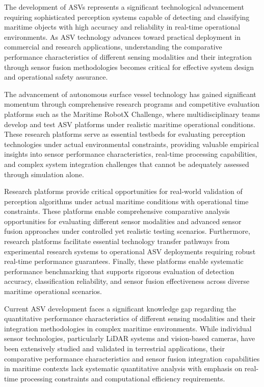 \documentclass{erauthesis}
\begin{document}
The development of \acp{ASV} represents a significant technological advancement requiring sophisticated perception systems capable of detecting and classifying maritime objects with high accuracy and reliability in real-time operational environments. As \ac{ASV} technology advances toward practical deployment in commercial and research applications, understanding the comparative performance characteristics of different sensing modalities and their integration through sensor fusion methodologies becomes critical for effective system design and operational safety assurance.

The advancement of autonomous surface vessel technology has gained significant momentum through comprehensive research programs and competitive evaluation platforms such as the Maritime RobotX Challenge, where multidisciplinary teams develop and test \ac{ASV} platforms under realistic maritime operational conditions. These research platforms serve as essential testbeds for evaluating perception technologies under actual environmental constraints, providing valuable empirical insights into sensor performance characteristics, real-time processing capabilities, and complex system integration challenges that cannot be adequately assessed through simulation alone.

Research platforms provide critical opportunities for real-world validation of perception algorithms under actual maritime conditions with operational time constraints. These platforms enable comprehensive comparative analysis opportunities for evaluating different sensor modalities and advanced sensor fusion approaches under controlled yet realistic testing scenarios. Furthermore, research platforms facilitate essential technology transfer pathways from experimental research systems to operational \ac{ASV} deployments requiring robust real-time performance guarantees. Finally, these platforms enable systematic performance benchmarking that supports rigorous evaluation of detection accuracy, classification reliability, and sensor fusion effectiveness across diverse maritime operational scenarios.

Current \ac{ASV} development faces a significant knowledge gap regarding the quantitative performance characteristics of different sensing modalities and their integration methodologies in complex maritime environments. While individual sensor technologies, particularly \ac{LiDAR} systems and vision-based cameras, have been extensively studied and validated in terrestrial applications, their comparative performance characteristics and sensor fusion integration capabilities in maritime contexts lack systematic quantitative analysis with emphasis on real-time processing constraints and computational efficiency requirements.
\end{document}
